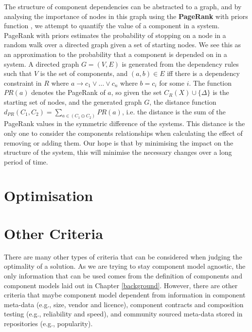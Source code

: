 The structure of component dependencies can be abstracted to a graph, 
and by analysing the importance of nodes in this graph using the \textbf{PageRank} with priors function \cite{White:2003:AER:956750.956782}, 
we attempt to quantify the value of a component in a system.
PageRank with priors estimates the probability of stopping on a node in a random walk over a directed graph given a set of starting nodes.
We see this as an approximation to the probability that a component is depended on in a system.
A directed graph $G = (V,E)$ is generated from the
dependency rules such that $V$ is the set of components, and $(a,b) \in E$ iff there is a dependency constraint in $R$ 
where $a \rightarrow c_1 \vee \ldots \vee c_n$ where $b = c_i$ for some $i$.
The function $PR(a)$ denotes the PageRank of $a$,
so given the set $C_R(X) \cup \{\Delta\}$ is the starting set of nodes, and the generated graph $G$,
the distance function $d_{PR}(C_1,C_2) = \sum_{a \in (C_1 \ominus C_2)} PR(a)$,
i.e. the distance is the sum of the PageRank values in the symmetric difference of the systems.
This distance is the only one to consider the components relationships when calculating the effect of removing or adding them.
Our hope is that by minimising the impact on the structure of the system, 
this will minimise the necessary changes over a long period of time.



\section{Optimisation}

\section{Other Criteria}
{}There are many other types of criteria that can be considered when judging the optimality of a solution.
{}As we are trying to stay component model agnostic, the only information that can be used comes from the definition of components and component models laid out in Chapter \ref{background}.
{}However, there are other criteria that maybe component model dependent from information in component meta-data (e.g., size, vendor and licence),
{}component contracts and composition testing (e.g., reliability and speed),
{}and community sourced meta-data stored in repositories (e.g., popularity).

